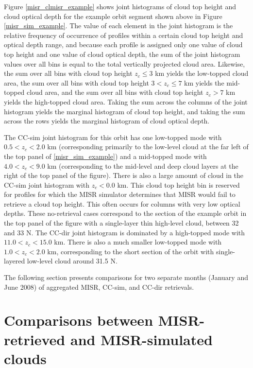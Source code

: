 Figure \ref{misr_clmisr_example} shows joint histograms of cloud top height and cloud optical depth for the example orbit segment shown above in Figure \ref{misr_sim_example}. The value of each element in the joint histogram is the relative frequency of occurrence of profiles within a certain cloud top height and optical depth range, and because each profile is assigned only one value of cloud top height and one value of cloud optical depth, the sum of the joint histogram values over all bins is equal to the total vertically projected cloud area. Likewise, the sum over all bins with cloud top height  $z_c \le 3$ km yields the low-topped cloud area, the sum over all bins with cloud top height $3 < z_c \le 7$ km yields the mid-topped cloud area, and the sum over all bins with cloud top height $z_c > 7$ km yields the high-topped cloud area. Taking the sum across the columns of the joint histogram yields the marginal histogram of cloud top height, and taking the sum across the rows yields the marginal histogram of cloud optical depth. 

The CC-sim joint histogram for this orbit has one low-topped mode with $0.5 < z_c < 2.0$ km (corresponding primarily to the low-level cloud at the far left of the top panel of \ref{misr_sim_example}) and a mid-topped mode with $4.0 < z_c < 9.0$ km (corresponding to the mid-level and deep cloud layers at the right of the top panel of the figure). There is also a large amount of cloud in the CC-sim joint histogram with $z_c < 0.0$ km. This cloud top height bin is reserved for profiles for which the MISR simulator determines that MISR would fail to retrieve a cloud top height. This often occurs for columns with very low optical depths. These no-retrieval cases correspond to the section of the example orbit in the top panel of the figure with a single-layer thin high-level cloud, between 32 and 33 N. The CC-dir joint histogram is dominated by a high-topped mode with $11.0 < z_c < 15.0$ km. There is also a much smaller low-topped mode with $1.0 < z_c < 2.0$ km, corresponding to the short section of the orbit with single-layered low-level cloud around 31.5 N.

The following section presents comparisons for two separate months (January and June 2008) of aggregated MISR, CC-sim, and CC-dir retrievals. 

\section{Comparisons between MISR-retrieved and MISR-simulated clouds}\label{misr_results}

